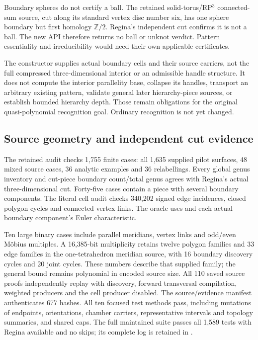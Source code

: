 Boundary spheres do not certify a ball. The retained solid-torus/RP$^3$
connected-sum source, cut along its standard vertex disc number six, has
one sphere boundary but first homology $\mathbb Z/2$. Regina's independent
cut confirms it is not a ball. The new API therefore returns no ball or
unknot verdict. Pattern essentiality and irreducibility would need their
own applicable certificates.

The constructor supplies actual boundary cells and their source carriers,
not the full compressed three-dimensional interior or an admissible handle
structure. It does not compute the interior parallelity base, collapse its
handles, transport an arbitrary existing pattern, validate general later
hierarchy-piece sources, or establish bounded hierarchy depth. Those remain
obligations for the original quasi-polynomial recognition goal. Ordinary
recognition is not yet changed.

\subsection{Source geometry and independent cut evidence}

The retained audit checks 1,755 finite cases: all 1,635 supplied pilot
surfaces, 48 mixed source cases, 36 analytic examples and 36 relabellings.
Every global genus inventory and cut-piece boundary count/total genus
agrees with Regina's actual three-dimensional cut. Forty-five cases contain
a piece with several boundary components. The literal cell audit checks
340,202 signed edge incidences, closed polygon cycles and connected vertex
links. The oracle uses  and each actual boundary component's
Euler characteristic\cite{regina-cut-along,regina-boundary-components}.

Ten large binary cases include parallel meridians, vertex links and odd/even
M\"obius multiples. A 16,385-bit multiplicity retains twelve polygon families
and 33 edge families in the one-tetrahedron meridian source, with 16 boundary
discovery cycles and 20 joint cycles. These numbers describe that supplied
family; the general bound remains polynomial in encoded source size.
All 110 saved source proofs independently replay with discovery, forward
transversal compilation, weighted producers and the cell producer disabled.
The source/evidence manifest authenticates 677 hashes. All ten focused
test methods pass, including mutations of endpoints, orientations, chamber
carriers, representative intervals and topology summaries, and shared caps.
The full maintained suite passes all 1,589 tests with Regina available and
no skips; its complete log is retained in .

